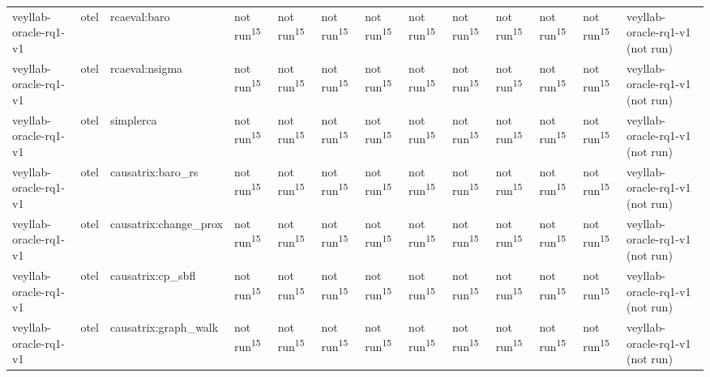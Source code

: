 \begin{table}[t]
\begin{tabular}{lllllllllllll}
veyllab-oracle-rq1-v1 & otel & rcaeval:baro & not run\textsuperscript{15} & not run\textsuperscript{15} & not run\textsuperscript{15} & not run\textsuperscript{15} & not run\textsuperscript{15} & not run\textsuperscript{15} & not run\textsuperscript{15} & not run\textsuperscript{15} & not run\textsuperscript{15} & veyllab-oracle-rq1-v1 (not run) \\
veyllab-oracle-rq1-v1 & otel & rcaeval:nsigma & not run\textsuperscript{15} & not run\textsuperscript{15} & not run\textsuperscript{15} & not run\textsuperscript{15} & not run\textsuperscript{15} & not run\textsuperscript{15} & not run\textsuperscript{15} & not run\textsuperscript{15} & not run\textsuperscript{15} & veyllab-oracle-rq1-v1 (not run) \\
veyllab-oracle-rq1-v1 & otel & simplerca & not run\textsuperscript{15} & not run\textsuperscript{15} & not run\textsuperscript{15} & not run\textsuperscript{15} & not run\textsuperscript{15} & not run\textsuperscript{15} & not run\textsuperscript{15} & not run\textsuperscript{15} & not run\textsuperscript{15} & veyllab-oracle-rq1-v1 (not run) \\
veyllab-oracle-rq1-v1 & otel & causatrix:baro\_rs & not run\textsuperscript{15} & not run\textsuperscript{15} & not run\textsuperscript{15} & not run\textsuperscript{15} & not run\textsuperscript{15} & not run\textsuperscript{15} & not run\textsuperscript{15} & not run\textsuperscript{15} & not run\textsuperscript{15} & veyllab-oracle-rq1-v1 (not run) \\
veyllab-oracle-rq1-v1 & otel & causatrix:change\_prox & not run\textsuperscript{15} & not run\textsuperscript{15} & not run\textsuperscript{15} & not run\textsuperscript{15} & not run\textsuperscript{15} & not run\textsuperscript{15} & not run\textsuperscript{15} & not run\textsuperscript{15} & not run\textsuperscript{15} & veyllab-oracle-rq1-v1 (not run) \\
veyllab-oracle-rq1-v1 & otel & causatrix:cp\_sbfl & not run\textsuperscript{15} & not run\textsuperscript{15} & not run\textsuperscript{15} & not run\textsuperscript{15} & not run\textsuperscript{15} & not run\textsuperscript{15} & not run\textsuperscript{15} & not run\textsuperscript{15} & not run\textsuperscript{15} & veyllab-oracle-rq1-v1 (not run) \\
veyllab-oracle-rq1-v1 & otel & causatrix:graph\_walk & not run\textsuperscript{15} & not run\textsuperscript{15} & not run\textsuperscript{15} & not run\textsuperscript{15} & not run\textsuperscript{15} & not run\textsuperscript{15} & not run\textsuperscript{15} & not run\textsuperscript{15} & not run\textsuperscript{15} & veyllab-oracle-rq1-v1 (not run) \\

\end{tabular}
\end{table}
